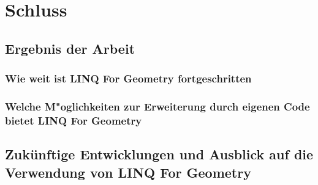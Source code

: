\documentclass[12pt,a4paper]{scrreprt}
\newcommand{\LFG}{LINQ For Geometry}
\newcommand{\LFGS}{LINQ For Geometry }
\begin{document}

\chapter {Schluss}
	\section {Ergebnis der Arbeit}
		\subsection {Wie weit ist \LFGS fortgeschritten}
		\subsection {Welche M"oglichkeiten zur Erweiterung durch eigenen Code bietet \LFG}
	\section {Zukünftige Entwicklungen und Ausblick auf die Verwendung von \LFG}





\lstlistoflistings
\newpage


\newpage
\end{document}
